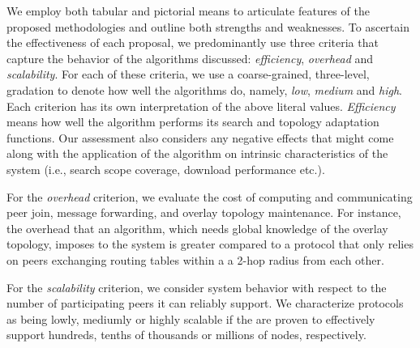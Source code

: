 We employ both tabular and pictorial means to 
articulate features of the proposed methodologies and outline
both strengths and weaknesses.
To ascertain the effectiveness of each proposal, we predominantly use 
three criteria that capture the behavior of the algorithms 
discussed:
\emph{efficiency}, \emph{overhead} and \emph{scalability}.
For each of these criteria, we use a coarse-grained,
three-level, gradation to denote how well the algorithms do,
namely, \emph{low}, \emph{medium} and \emph{high}.
Each criterion has its own
interpretation of the above literal values. 
\emph{Efficiency} means how well the
algorithm performs its search and topology adaptation functions. Our assessment
also considers any negative effects that might come along with the application
of the algorithm on intrinsic characteristics of the system (i.e., search scope
coverage, download performance etc.).

For the \emph{overhead} criterion, we evaluate the cost
of computing and communicating peer join, message forwarding, 
and overlay topology maintenance. For instance, the overhead that an algorithm,
which needs global knowledge of the overlay topology, imposes to the system is
greater compared to a protocol that only relies on peers exchanging routing
tables within a a 2-hop radius from each other.

For the \emph{scalability} criterion, we consider system behavior with respect
to the number of participating peers it can reliably support. We characterize
protocols as being lowly, mediumly or highly scalable if the are proven to
effectively support hundreds, tenths of thousands or millions of nodes,
respectively.
